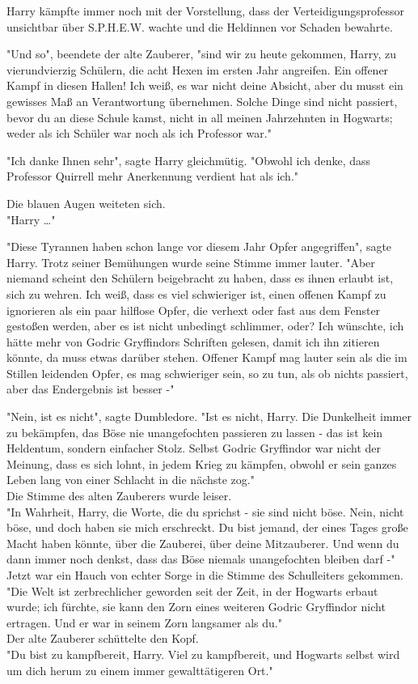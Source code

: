 {Harry kämpfte immer noch mit der Vorstellung, dass der Verteidigungsprofessor unsichtbar über S.P.H.E.W. wachte und die Heldinnen vor Schaden bewahrte.

"Und so", beendete der alte Zauberer, "sind wir zu heute gekommen, Harry, zu vierundvierzig Schülern, die acht Hexen im ersten Jahr angreifen. Ein offener Kampf in diesen Hallen! Ich weiß, es war nicht deine Absicht, aber du musst ein gewisses Maß an Verantwortung übernehmen. Solche Dinge sind nicht passiert, bevor du an diese Schule kamst, nicht in all meinen Jahrzehnten in Hogwarts; weder als ich Schüler war noch als ich Professor war."

"Ich danke Ihnen sehr", sagte Harry gleichmütig. "Obwohl ich denke, dass Professor Quirrell mehr Anerkennung verdient hat als ich."

Die blauen Augen weiteten sich.\\ "Harry …"

"Diese Tyrannen haben schon lange vor diesem Jahr Opfer angegriffen", sagte Harry. Trotz seiner Bemühungen wurde seine Stimme immer lauter. "Aber niemand scheint den Schülern beigebracht zu haben, dass es ihnen erlaubt ist, sich zu wehren. Ich weiß, dass es viel schwieriger ist, einen offenen Kampf zu ignorieren als ein paar hilflose Opfer, die verhext oder fast aus dem Fenster gestoßen werden, aber es ist nicht unbedingt schlimmer, oder? Ich wünschte, ich hätte mehr von Godric Gryffindors Schriften gelesen, damit ich ihn zitieren könnte, da muss etwas darüber stehen. Offener Kampf mag lauter sein als die im Stillen leidenden Opfer, es mag schwieriger sein, so zu tun, als ob nichts passiert, aber das Endergebnis ist besser -"

"Nein, ist es nicht", sagte Dumbledore. "Ist es nicht, Harry. Die Dunkelheit immer zu bekämpfen, das Böse nie unangefochten passieren zu lassen - das ist kein Heldentum, sondern einfacher Stolz. Selbst Godric Gryffindor war nicht der Meinung, dass es sich lohnt, in jedem Krieg zu kämpfen, obwohl er sein ganzes Leben lang von einer Schlacht in die nächste zog."\\ Die Stimme des alten Zauberers wurde leiser.\\ "In Wahrheit, Harry, die Worte, die du sprichst - sie sind nicht böse. Nein, nicht böse, und doch haben sie mich erschreckt. Du bist jemand, der eines Tages große Macht haben könnte, über die Zauberei, über deine Mitzauberer. Und wenn du dann immer noch denkst, dass das Böse niemals unangefochten bleiben darf -"\\ Jetzt war ein Hauch von echter Sorge in die Stimme des Schulleiters gekommen.\\ "Die Welt ist zerbrechlicher geworden seit der Zeit, in der Hogwarts erbaut wurde; ich fürchte, sie kann den Zorn eines weiteren Godric Gryffindor nicht ertragen. Und er war in seinem Zorn langsamer als du."\\ Der alte Zauberer schüttelte den Kopf.\\ "Du bist zu kampfbereit, Harry. Viel zu kampfbereit, und Hogwarts selbst wird um dich herum zu einem immer gewalttätigeren Ort."

}
